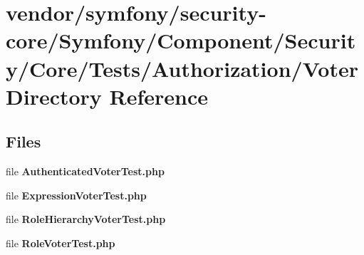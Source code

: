 \section{vendor/symfony/security-\/core/\+Symfony/\+Component/\+Security/\+Core/\+Tests/\+Authorization/\+Voter Directory Reference}
\label{dir_ee089e174e09b5d79558a7b5f736b3d6}
\subsection*{Files}
\begin{DoxyCompactItemize}
\item 
file {\bf Authenticated\+Voter\+Test.\+php}
\item 
file {\bf Expression\+Voter\+Test.\+php}
\item 
file {\bf Role\+Hierarchy\+Voter\+Test.\+php}
\item 
file {\bf Role\+Voter\+Test.\+php}
\end{DoxyCompactItemize}
